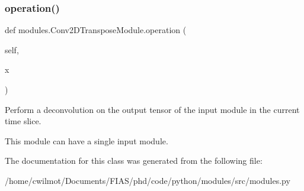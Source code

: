 \subsubsection{\texorpdfstring{operation()}{operation()}}
{\footnotesize\ttfamily def modules.\+Conv2\+D\+Transpose\+Module.\+operation (\begin{DoxyParamCaption}\item[{}]{self,  }\item[{}]{x }\end{DoxyParamCaption})}



Perform a deconvolution on the output tensor of the input module in the current time slice. 

This module can have a single input module. 

The documentation for this class was generated from the following file\+:\begin{DoxyCompactItemize}
\item 
/home/cwilmot/\+Documents/\+F\+I\+A\+S/phd/code/python/modules/src/modules.\+py\end{DoxyCompactItemize}
